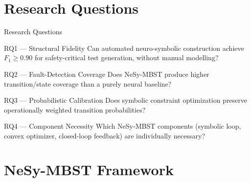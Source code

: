 \documentclass[aspectratio=169,10pt]{beamer}
\begin{document}
\section{Research Questions}

\begin{frame}{Research Questions}
  \begin{block}{RQ1 — Structural Fidelity}
    Can automated neuro-symbolic construction achieve $F_1 \geq 0.90$ for safety-critical test generation, without manual modelling?
  \end{block}
  \vspace{0.2em}
  \begin{block}{RQ2 — Fault-Detection Coverage}
    Does NeSy-MBST produce higher transition/state coverage than a purely neural baseline?
  \end{block}
  \vspace{0.2em}
  \begin{block}{RQ3 — Probabilistic Calibration}
    Does symbolic constraint optimization preserve operationally weighted transition probabilities?
  \end{block}
  \vspace{0.2em}
  \begin{block}{RQ4 — Component Necessity}
    Which NeSy-MBST components (symbolic loop, convex optimizer, closed-loop feedback) are individually necessary?
  \end{block}
\end{frame}

\section{NeSy-MBST Framework}
\end{document}
